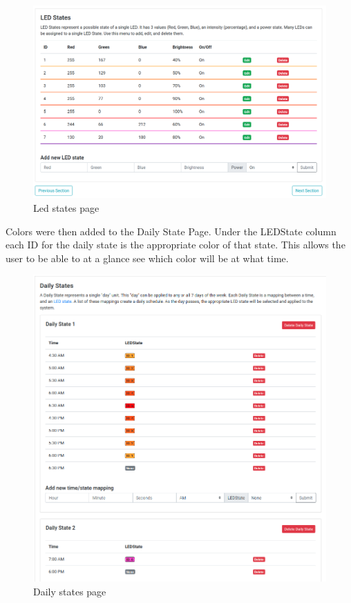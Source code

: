\documentclass[onecolumn, draftclsnofoot,10pt, compsoc]{IEEEtran}
\begin{document}
		\begin{center}
			\begin{figure}[H]
				\includegraphics[width=\linewidth]{site/led_states.png}
				\caption{Led states page}
				\label{fig:siteLEDStates}
			\end{figure}
		\end{center}

		\noindent Colors were then added to the Daily State Page. Under the LEDState column each ID for the daily state is the appropriate color of that 
		state. This allows the user to be able to at a glance see which color will be at what time.


		\begin{center}
			\begin{figure}[H]
				\includegraphics[width=\linewidth]{site/daily_states.png}
				\caption{Daily states page}
				\label{fig:siteDailyStates}
			\end{figure}
		\end{center}
\end{document}
